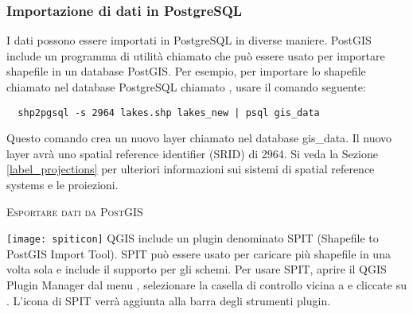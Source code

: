 \subsubsection{Importazione di dati in PostgreSQL}\label{sec:loading_postgis_data}

I dati possono essere importati in PostgreSQL in diverse maniere. PostGIS
include un programma di utilità chiamato  che può essere
usato per importare shapefile in un database PostGIS. Per esempio, per
importare lo shapefile chiamato 
nel database PostgreSQL chiamato , usare il comando
seguente:

\begin{verbatim} 
  shp2pgsql -s 2964 lakes.shp lakes_new | psql gis_data
\end{verbatim}

Questo comando crea un nuovo layer chiamato  nel database
{gis\_data}. Il nuovo layer avrà uno spatial reference identifier (SRID) di
2964. Si veda la Sezione \ref{label_projections} per ulteriori informazioni
sui sistemi di spatial reference systems e le proiezioni.
\begin{Tip}
\caption{\textsc{Esportare dati da PostGIS}}
\end{Tip}

\texttt{[image: spiticon]} QGIS include un plugin denominato SPIT (Shapefile to PostGIS Import Tool).
SPIT può essere usato per caricare più shapefile in una volta sola e
include il supporto per gli schemi. Per usare SPIT, aprire il QGIS Plugin Manager
dal menu , selezionare la casella di controllo vicina a
 e cliccate su . L'icona di SPIT verrà aggiunta alla
barra degli strumenti plugin. 

